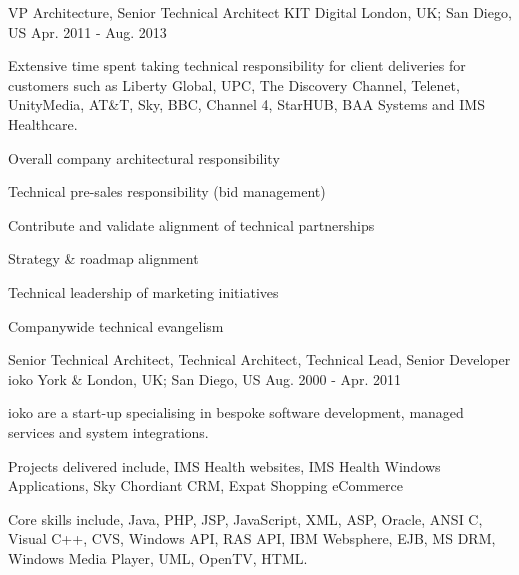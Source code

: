 \begin{cventries}
\cvexpentry
{VP Architecture, Senior Technical Architect} %
{KIT Digital} %
{London, UK; San Diego, US} %
{Apr. 2011 - Aug. 2013} %
{
\begin{cvitemstitle}
\item {Extensive time spent taking technical responsibility for client deliveries for customers such as Liberty Global, UPC, The Discovery Channel, Telenet, UnityMedia, AT\&T, Sky, BBC, Channel 4, StarHUB, BAA Systems and IMS Healthcare.}
\end{cvitemstitle}
}
{ %
\begin{cvitems}
\item{Overall company architectural responsibility}
\item{Technical pre-sales responsibility (bid management)}
\item{Contribute and validate alignment of technical partnerships}
\item{Strategy \& roadmap alignment}
\item{Technical leadership of marketing initiatives}
\item{Companywide technical evangelism }
\end{cvitems}
}


\cvexpentry
{Senior Technical Architect, Technical Architect, Technical Lead, Senior Developer} %
{ioko} %
{York \& London, UK; San Diego, US} %
{Aug. 2000 - Apr. 2011} %
{
\begin{cvitemstitle}
\item {ioko are a start-up specialising in bespoke software development, managed services and system integrations.}
\end{cvitemstitle}
}
{ %
\begin{cvitems}
\item {Projects delivered include, IMS Health websites, IMS Health Windows Applications, Sky Chordiant CRM, Expat Shopping eCommerce}
\item {Core skills include, Java, PHP, JSP, JavaScript, XML, ASP, Oracle, ANSI C, Visual C++, CVS, Windows API, RAS API, IBM Websphere, EJB, MS DRM, Windows Media Player, UML, OpenTV, HTML.}
\end{cvitems}
}


\end{cventries}
